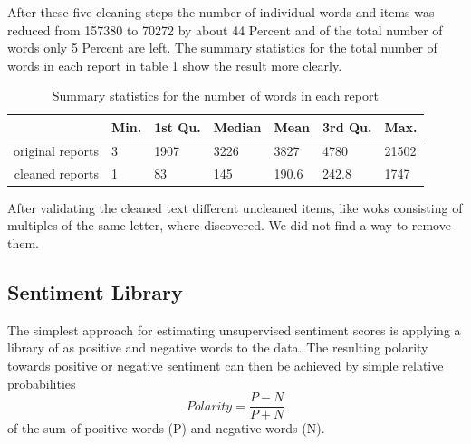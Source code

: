 After these five cleaning steps the number of individual words and items was reduced from 157380 to 70272 by about 44 Percent and of the total number of words only 5 Percent are left. The summary statistics for the total number of words in each report in table \ref{tab:summaryCR} show the result more clearly. 
\begin{table}[ht]
\centering
\begin{tabular}{rllllll}
  \hline
  & Min. & 1st Qu. & Median  &  Mean & 3rd Qu. &   Max. \\
  \hline
  original reports & 3    &  1907 &  3226  &  3827 &  4780 &  21502  \\ 
  cleaned reports  & 1  &  83 &  145 & 190.6 & 242.8 & 1747  \\ 
   \hline
\end{tabular}\label{tab:summaryCR}
\caption{Summary statistics for the number of words in each report}
\end{table}

After validating the cleaned text different uncleaned items, like woks consisting of multiples of the same letter, where discovered. We did not find a way to remove them.

\subsection{Sentiment Library}\label{BoW}
The simplest approach for estimating unsupervised sentiment scores is applying a library of as positive and negative words to the data. The resulting polarity towards positive or negative sentiment can then be achieved by simple relative probabilities
\begin{equation}
    Polarity = \frac{P - N}{P + N}
\end{equation}
of the sum of positive words (P) and negative words (N). 

